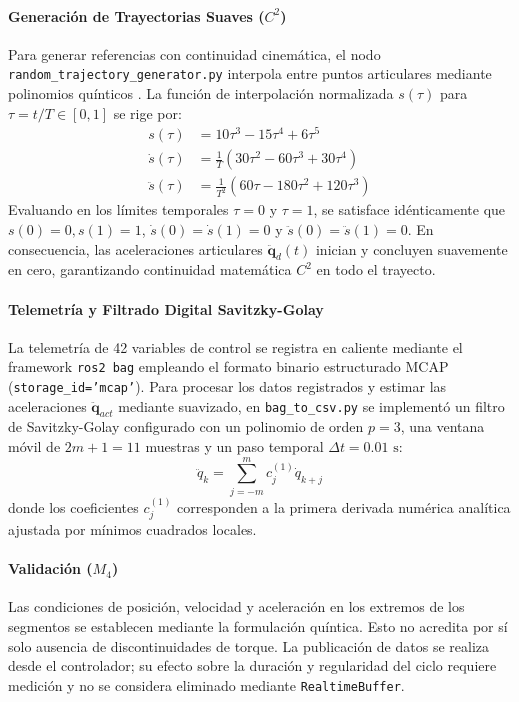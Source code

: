 \documentclass[12pt]{article}
\begin{document}
\paragraph{Generación de Trayectorias Suaves ($C^2$)}
Para generar referencias con continuidad cinemática, el nodo \texttt{random\_trajectory\_generator.py} interpola entre puntos articulares mediante polinomios quínticos \cite{biagiotti2008trajectory}. La función de interpolación normalizada $s(\tau)$ para $\tau = t / T \in [0, 1]$ se rige por:
\begin{align}
    s(\tau) &= 10\tau^3 - 15\tau^4 + 6\tau^5 \label{eq:quintic_pos} \\
    \dot{s}(\tau) &= \frac{1}{T}\left( 30\tau^2 - 60\tau^3 + 30\tau^4 \right) \label{eq:quintic_vel} \\
    \ddot{s}(\tau) &= \frac{1}{T^2}\left( 60\tau - 180\tau^2 + 120\tau^3 \right) \label{eq:quintic_acc}
\end{align}
Evaluando en los límites temporales $\tau = 0$ y $\tau = 1$, se satisface idénticamente que $s(0)=0, s(1)=1$, $\dot{s}(0)=\dot{s}(1)=0$ y $\ddot{s}(0)=\ddot{s}(1)=0$. En consecuencia, las aceleraciones articulares $\ddot{\bm{q}}_d(t)$ inician y concluyen suavemente en cero, garantizando continuidad matemática $C^2$ en todo el trayecto.

\paragraph{Telemetría y Filtrado Digital Savitzky-Golay}
La telemetría de 42 variables de control se registra en caliente mediante el framework \texttt{ros2 bag} empleando el formato binario estructurado MCAP (\texttt{storage\_id='mcap'}). Para procesar los datos registrados y estimar las aceleraciones $\ddot{\bm{q}}_{act}$ mediante suavizado, en \texttt{bag\_to\_csv.py} se implementó un filtro de Savitzky-Golay \cite{savitzky1964smoothing} configurado con un polinomio de orden $p=3$, una ventana móvil de $2m+1=11$ muestras y un paso temporal $\Delta t = 0.01\text{ s}$:
\begin{equation}
    \ddot{q}_{k} = \sum_{j=-m}^m c_j^{(1)} \dot{q}_{k+j}
    \label{eq:savgol_filter}
\end{equation}
donde los coeficientes $c_j^{(1)}$ corresponden a la primera derivada numérica analítica ajustada por mínimos cuadrados locales.

\paragraph{Validación ($M_4$)}
Las condiciones de posición, velocidad y aceleración en los extremos de los segmentos se establecen mediante la formulación quíntica. Esto no acredita por sí solo ausencia de discontinuidades de torque. La publicación de datos se realiza desde el controlador; su efecto sobre la duración y regularidad del ciclo requiere medición y no se considera eliminado mediante \texttt{RealtimeBuffer}.
\end{document}
